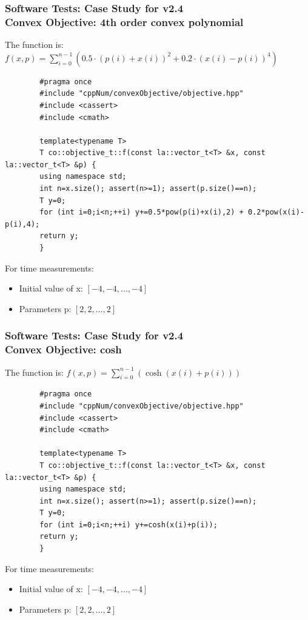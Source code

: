 \documentclass[ucs,10pt]{beamer}
\begin{document}
\begin{frame}[fragile]
\frametitle{Software Tests: Case Study for v2.4 \\
	\small \color{rwth-blue} Convex Objective: 4th order convex polynomial}
	The function is:
	$f(x, p) = \sum_{i=0}^{n-1} (0.5 \cdot (p(i) + x(i))^2 + 0.2 \cdot (x(i) - p(i))^4)$
	\begin{lstlisting}
		#pragma once
		#include "cppNum/convexObjective/objective.hpp"
		#include <cassert>
		#include <cmath>
		
		template<typename T> 
		T co::objective_t::f(const la::vector_t<T> &x, const la::vector_t<T> &p) { 
		using namespace std;
		int n=x.size(); assert(n>=1); assert(p.size()==n);
		T y=0;
		for (int i=0;i<n;++i) y+=0.5*pow(p(i)+x(i),2) + 0.2*pow(x(i)-p(i),4);
		return y;
		}
	\end{lstlisting}
	For time measurements:
	\begin{itemize}
		\item Initial value of x: $[-4, -4, ..., -4]$
		\item Parameters p: $[2, 2, ..., 2]$
	\end{itemize}
\end{frame}
	
\begin{frame}[fragile]
\frametitle{Software Tests: Case Study for v2.4 \\
	\small \color{rwth-blue} Convex Objective: cosh}
	The function is:
	$f(x, p) = \sum_{i=0}^{n-1} (\cosh(x(i) + p(i)))$
	\begin{lstlisting}
		#pragma once
		#include "cppNum/convexObjective/objective.hpp"
		#include <cassert>
		#include <cmath>
		
		template<typename T> 
		T co::objective_t::f(const la::vector_t<T> &x, const la::vector_t<T> &p) { 
		using namespace std;
		int n=x.size(); assert(n>=1); assert(p.size()==n);
		T y=0;
		for (int i=0;i<n;++i) y+=cosh(x(i)+p(i));
		return y;
		}
	\end{lstlisting}
        For time measurements:
        \begin{itemize}
                \item Initial value of x: $[-4, -4, ..., -4]$
                \item Parameters p: $[2, 2, ..., 2]$
        \end{itemize}
\end{frame}
	
\end{document}
